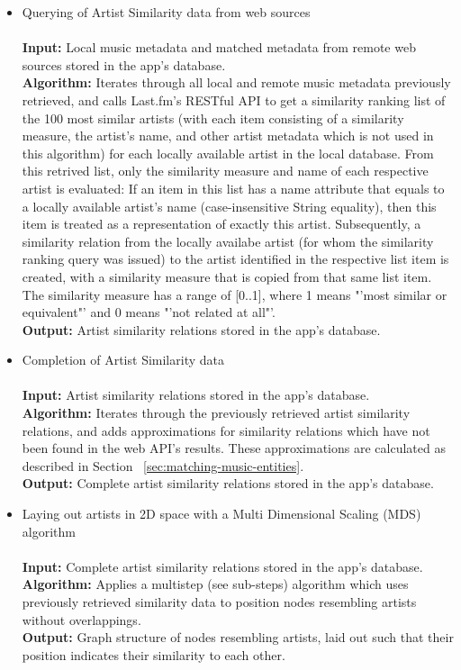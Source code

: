 \begin{itemize}
	\item Querying of Artist Similarity data from web sources \\\\
			\textbf{Input:} Local music metadata and matched metadata from remote web sources stored in the app's database. \\
			\textbf{Algorithm:} Iterates through all local and remote music metadata previously retrieved, and calls
			Last.fm's RESTful API to get a similarity ranking list of the 100 most similar artists (with each item consisting of a similarity measure, the artist's name, and other artist metadata which is not used in this algorithm) for each locally available artist in the local database. From this retrived list, only the similarity measure and name of each respective artist is evaluated: If an item in this list has a name attribute that equals to a locally available artist's name (case-insensitive String equality), then this item is treated as a representation of exactly this artist. Subsequently, a similarity relation from the locally availabe artist (for whom the similarity ranking query was issued) to the artist identified in the respective list item is created, with a similarity measure that is copied from that same list item. The similarity measure has a range of [0..1], where 1 means "'most similar or equivalent"' and 0 means "'not related at all"'.\\
			\textbf{Output:} Artist similarity relations stored in the app's database. \\
			
	\item Completion of Artist Similarity data \\\\
			\textbf{Input:} Artist similarity relations stored in the app's database. \\
			\textbf{Algorithm:} Iterates through the previously retrieved artist similarity relations, and
			adds approximations for similarity relations which have not been found in the web API's results.
			These approximations are calculated as described in Section ~\ref{sec:matching-music-entities}. \\
			\textbf{Output:} Complete artist similarity relations stored in the app's database. \\
			
	\item Laying out artists in 2D space with a Multi Dimensional Scaling (MDS) algorithm \\\\
			\textbf{Input:} Complete artist similarity relations stored in the app's database.   \\
			\textbf{Algorithm:} Applies a multistep (see sub-steps) algorithm which uses previously
			retrieved similarity data to position nodes resembling artists without overlappings.  \\
			\textbf{Output:} Graph structure of nodes resembling artists, laid out such that their position 
			indicates their similarity to each other. \\
			

\end{itemize}
